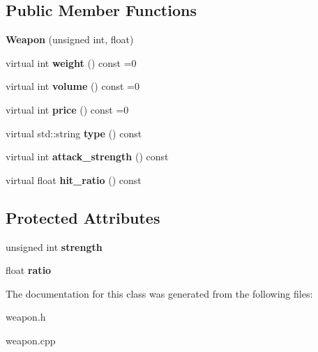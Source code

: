 \subsection*{Public Member Functions}
\begin{DoxyCompactItemize}
\item 
\hypertarget{classda__game_1_1Weapon_a88a5f2653bd77a5c4676871de3667604}{
{\bfseries Weapon} (unsigned int, float)}
\label{classda__game_1_1Weapon_a88a5f2653bd77a5c4676871de3667604}

\item 
\hypertarget{classda__game_1_1Weapon_a771944b2740e932845cec03eb644b563}{
virtual int {\bfseries weight} () const =0}
\label{classda__game_1_1Weapon_a771944b2740e932845cec03eb644b563}

\item 
\hypertarget{classda__game_1_1Weapon_a8769a66179398eb6b1b26b418c5cdb9f}{
virtual int {\bfseries volume} () const =0}
\label{classda__game_1_1Weapon_a8769a66179398eb6b1b26b418c5cdb9f}

\item 
\hypertarget{classda__game_1_1Weapon_aae5de95ab6a421f4799fc2f56fe04711}{
virtual int {\bfseries price} () const =0}
\label{classda__game_1_1Weapon_aae5de95ab6a421f4799fc2f56fe04711}

\item 
\hypertarget{classda__game_1_1Weapon_a0b5b2840ddee8fb059dd03849b2d4617}{
virtual std::string {\bfseries type} () const }
\label{classda__game_1_1Weapon_a0b5b2840ddee8fb059dd03849b2d4617}

\item 
\hypertarget{classda__game_1_1Weapon_ad0d737c1f1535fba0e1152daaa844a55}{
virtual int {\bfseries attack\_\-strength} () const }
\label{classda__game_1_1Weapon_ad0d737c1f1535fba0e1152daaa844a55}

\item 
\hypertarget{classda__game_1_1Weapon_a7ef8c157cc461a7fc1958f76652b0415}{
virtual float {\bfseries hit\_\-ratio} () const }
\label{classda__game_1_1Weapon_a7ef8c157cc461a7fc1958f76652b0415}

\end{DoxyCompactItemize}
\subsection*{Protected Attributes}
\begin{DoxyCompactItemize}
\item 
\hypertarget{classda__game_1_1Weapon_ac616cc0adf463730be8f90175b958309}{
unsigned int {\bfseries strength}}
\label{classda__game_1_1Weapon_ac616cc0adf463730be8f90175b958309}

\item 
\hypertarget{classda__game_1_1Weapon_ad712d94d84353fdae7dc4c0a82b52d91}{
float {\bfseries ratio}}
\label{classda__game_1_1Weapon_ad712d94d84353fdae7dc4c0a82b52d91}

\end{DoxyCompactItemize}


The documentation for this class was generated from the following files:\begin{DoxyCompactItemize}
\item 
weapon.h\item 
weapon.cpp\end{DoxyCompactItemize}
